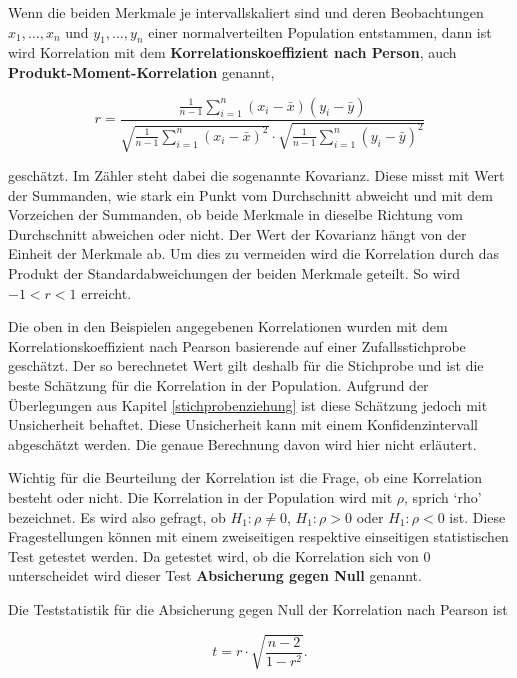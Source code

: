 \documentclass[
]{book}
\theoremstyle{definition}
\theoremstyle{definition}
\theoremstyle{definition}
\theoremstyle{definition}
\theoremstyle{remark}
\begin{document}
Wenn die beiden Merkmale je intervallskaliert sind und deren Beobachtungen \(x_1, \ldots, x_n\) und \(y_1,\ldots, y_n\) einer normalverteilten Population entstammen, dann ist wird Korrelation mit dem \label{customdef-pearson-korrelation}{\textbf{Korrelationskoeffizient nach Person}}, auch \label{customdef-podukt-moment-korrelation}{\textbf{Produkt-Moment-Korrelation}} genannt,

\[
r = \frac{\frac{1}{n-1} \sum_{i=1}^n (x_i - \bar{x})(y_i - \bar{y})}{\sqrt{\frac{1}{n-1}\sum_{i=1}^n (x_i - \bar{x})^2}\cdot \sqrt{\frac{1}{n-1}\sum_{i=1}^n (y_i - \bar{y})^2}}
\]

geschätzt. Im Zähler steht dabei die sogenannte Kovarianz. Diese misst mit Wert der Summanden, wie stark ein Punkt vom Durchschnitt abweicht und mit dem Vorzeichen der Summanden, ob beide Merkmale in dieselbe Richtung vom Durchschnitt abweichen oder nicht. Der Wert der Kovarianz hängt von der Einheit der Merkmale ab. Um dies zu vermeiden wird die Korrelation durch das Produkt der Standardabweichungen der beiden Merkmale geteilt. So wird \(-1<r<1\) erreicht.

Die oben in den Beispielen angegebenen Korrelationen wurden mit dem Korrelationskoeffizient nach Pearson basierende auf einer Zufallsstichprobe geschätzt. Der so berechnetet Wert gilt deshalb für die Stichprobe und ist die beste Schätzung für die Korrelation in der Population. Aufgrund der Überlegungen aus Kapitel \ref{stichprobenziehung} ist diese Schätzung jedoch mit Unsicherheit behaftet. Diese Unsicherheit kann mit einem Konfidenzintervall abgeschätzt werden. Die genaue Berechnung davon wird hier nicht erläutert.

Wichtig für die Beurteilung der Korrelation ist die Frage, ob eine Korrelation besteht oder nicht. Die Korrelation in der Population wird mit \(\rho\), sprich `rho' bezeichnet. Es wird also gefragt, ob \(H_1: \rho \neq 0\), \(H_1: \rho > 0\) oder \(H_1: \rho < 0\) ist. Diese Fragestellungen können mit einem zweiseitigen respektive einseitigen statistischen Test getestet werden. Da getestet wird, ob die Korrelation sich von \(0\) unterscheidet wird dieser Test \label{customdef-podukt-moment-absichern-null}{\textbf{Absicherung gegen Null}} genannt.

Die Teststatistik für die Absicherung gegen Null der Korrelation nach Pearson ist

\begin{equation}
t = r\cdot \sqrt{\frac{n-2}{1-r^2}}.
\label{eq:absichern-pearson}
\end{equation}
\end{document}

